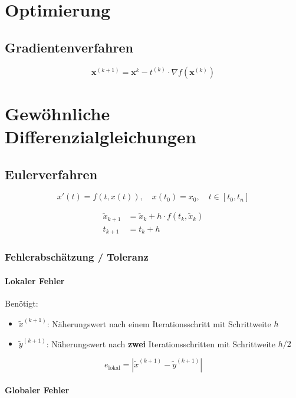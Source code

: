 \documentclass[a4paper, twoside]{article}
\begin{document}
\section{Optimierung}

\subsection{Gradientenverfahren}

\[\mathbf{x}^{(k+1)} = \mathbf{x}^{k} - t^{(k)} \cdot \nabla f\left(\mathbf{x}^{(k)}\right)\]

\section{Gewöhnliche Differenzialgleichungen}

\subsection{Eulerverfahren}

\[x'(t) = f(t, x(t)),\quad x(t_{0}) = x_{0},\quad t \in [t_{0}, t_{n}]\]

\begin{align*}
  \tilde{x}_{k+1} &= \tilde{x}_{k} + h \cdot f(t_{k}, \tilde{x}_{k})\\[1em]
  t_{k+1} &= t_{k} + h
\end{align*}

\subsubsection{Fehlerabschätzung / Toleranz}

\paragraph{Lokaler Fehler}

Benötigt:

\begin{itemize}
\item \(\tilde{x}^{(k+1)}\): Näherungswert nach einem Iterationsschritt mit Schrittweite \(h\)
\item \(\tilde{y}^{(k+1)}\): Näherungswert nach \textbf{zwei} Iterationsschritten mit Schrittweite \(h/2\)
\end{itemize}

\[e_{\text{lokal}} = |\tilde{x}^{(k+1)} - \tilde{y}^{(k+1)}|\]

\paragraph{Globaler Fehler}
\end{document}
